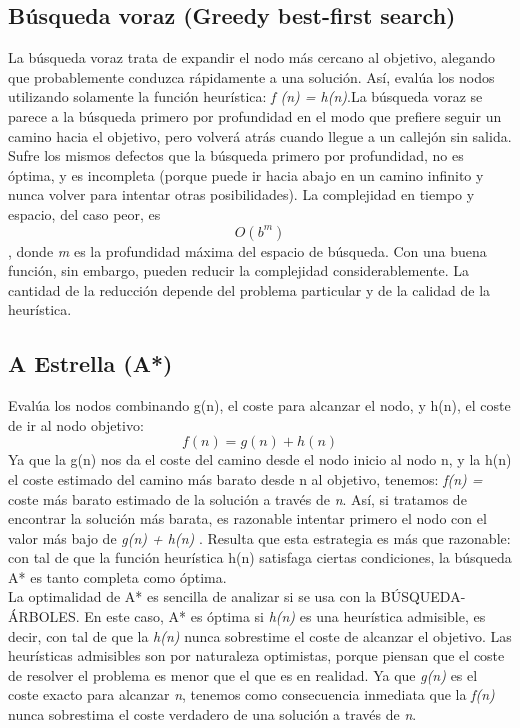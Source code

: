\documentclass[12pt,a4paper]{report}
\begin{document}
\subsection*{Búsqueda voraz (Greedy best-first search)}
La búsqueda voraz trata de expandir el nodo más cercano al objetivo, alegando que probablemente conduzca rápidamente a una solución. Así, evalúa los nodos utilizando solamente la función heurística: \emph{ f (n) = h(n)}.La búsqueda voraz se parece a la búsqueda primero por profundidad en el modo que prefiere seguir un camino hacia el objetivo, pero volverá atrás cuando llegue a un callejón sin salida. Sufre los mismos defectos que la búsqueda primero por profundidad, no es óptima, y es incompleta (porque puede ir hacia abajo en un camino infinito y nunca volver para intentar otras posibilidades). La complejidad en tiempo y espacio, del caso peor, es \begin{equation}O(b ^{m} ) 
\end{equation} , donde \emph{m} es la profundidad máxima del espacio de búsqueda. Con una buena función, sin embargo, pueden reducir la complejidad considerablemente. La cantidad de la reducción depende del problema particular y de la calidad de la heurística.
\subsection*{A Estrella (A*)}
Evalúa los nodos combinando g(n), el coste para alcanzar el nodo, y h(n), el coste de ir al nodo objetivo:
\begin{equation}
f(n) = g(n) + h(n)
\end{equation}
Ya que la g(n) nos da el coste del camino desde el nodo inicio al nodo n, y la h(n) el coste estimado del camino más barato desde n al objetivo, tenemos:
\emph{f(n) =} coste más barato estimado de la solución a través de \emph{n}. Así, si tratamos de encontrar la solución más barata, es razonable intentar primero el nodo con el valor más bajo de \emph{ g(n) + h(n) }. Resulta que esta estrategia es más que razonable: con tal de que la función heurística h(n) satisfaga ciertas condiciones, la búsqueda A* es tanto completa como óptima.\\La optimalidad de A* es sencilla de analizar si se usa con la BÚSQUEDA-ÁRBOLES. En este caso, A* es óptima si \emph{h(n)} es una heurística admisible, es decir, con tal de que la \emph{h(n)} nunca sobrestime el coste de alcanzar el objetivo. Las heurísticas admisibles son por naturaleza optimistas, porque piensan que el coste de resolver el problema es menor que el que es en realidad. Ya que \emph{g(n)} es el coste exacto para alcanzar \emph{n}, tenemos como consecuencia inmediata que la \emph{f(n)} nunca sobrestima el coste verdadero de una solución a través de \emph{n}.
\end{document}
